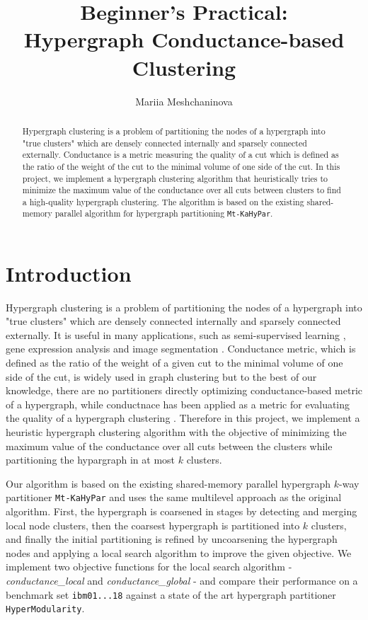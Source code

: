 \documentclass[acmsmall,nonacm,screen,review]{acmart}
\title{Beginner's Practical: \\ Hypergraph Conductance-based Clustering}
\author{Mariia Meshchaninova}
\affiliation{%
  \institution{Heidelberg University}
  \streetaddress{Im Neuenheimer Feld 205}
  \city{Heidelberg}
  \state{Baden-Württemberg}
  \country{Germany}
  \postcode{69120}
}
\date{}
\begin{document}
\begin{abstract}
Hypergraph clustering is a problem of partitioning the nodes of 
a hypergraph into "true clusters" which are densely connected internally 
and sparsely connected externally. Conductance is a metric measuring the 
quality of a cut which is defined as the ratio of the weight of the cut 
to the minimal volume of one side of the cut.
In this project, we implement a hypergraph clustering algorithm that
heuristically tries to minimize the maximum value of the conductance 
over all cuts between clusters to find a high-quality hypergraph 
clustering. The algorithm is based on the existing shared-memory 
parallel algorithm for hypergraph partitioning \texttt{Mt-KaHyPar}.
\end{abstract}
\maketitle

\section{Introduction}
Hypergraph clustering is a problem of partitioning the nodes of a hypergraph
into "true clusters" which are densely connected internally and sparsely
connected externally. It is useful in many applications, such as 
semi-supervised learning \cite{ApplicationLearning}, 
gene expression analysis \cite{ApplicationGeneExpression}
and image segmentation \cite{ApplicationImageSegmentation}. 
Conductance metric, which is defined as the ratio of the weight of a given
cut to the minimal volume of one side of the cut, is widely used in graph 
clustering \cite{GraphConductance2023,GraphConductance2006} but to the best
of our knowledge, there are no partitioners directly optimizing
conductance-based metric of a hypergraph, while conductnace has been applied 
as a metric for evaluating the quality of a hypergraph clustering 
\cite{HyperSF}. Therefore in this project, we implement a heuristic hypergraph 
clustering algorithm with the objective of minimizing the maximum value of 
the conductance over all cuts between the clusters while partitioning 
the hypargraph in at most $k$ clusters. 

\noindent Our algorithm is based on the existing shared-memory parallel 
hypergraph $k$-way partitioner \texttt{Mt-KaHyPar} and uses the same 
multilevel approach as the original algorithm. First, the hypergraph is 
coarsened in stages by detecting and merging local node clusters, then the 
coarsest hypergraph is partitioned into $k$ clusters, and finally the 
initial partitioning is refined by uncoarsening the hypergraph nodes and 
applying a local search algorithm to improve the given objective. We 
implement two objective functions for the local search algorithm - 
\textit{conductance\_local} and \textit{conductance\_global} - 
and compare their performance on a benchmark set \texttt{ibm01...18} 
against a state of the art hypergraph partitioner \texttt{HyperModularity}.
\end{document}
